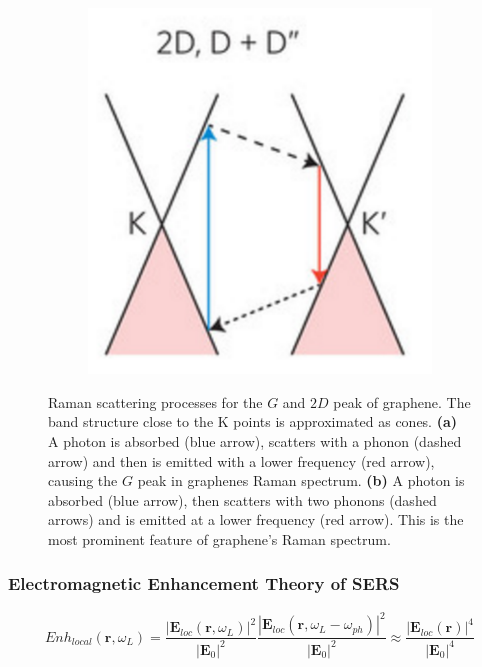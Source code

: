 \begin{figure}[!h]
\begin{subfigure}{0.2\textwidth}
  \end{subfigure}
  ~
  \begin{subfigure}{0.45\textwidth}
    \includegraphics[width=\textwidth]{./images/2d-mode.png}
  \end{subfigure}
  \caption{Raman scattering processes for the $G$ and $2D$ peak of graphene. The band structure close to the K points is approximated as cones. \textbf{(a)} A photon is absorbed (blue arrow), scatters with a phonon (dashed arrow) and then is emitted with a lower frequency (red arrow), causing the $G$ peak in graphenes Raman spectrum. \textbf{(b)} A photon is absorbed (blue arrow), then scatters with two phonons (dashed arrows) and is emitted at a lower frequency (red arrow). This is the most prominent feature of graphene's Raman spectrum. }
  \label{fig:raman-modes}
\end{figure}

\null\newpage
\null\newpage

\subsubsection{Electromagnetic Enhancement Theory of SERS}

\begin{equation}
  Enh_{local}(\mathbf{r},\omega_L)=\frac{\left|\mathbf{E}_{loc}(\mathbf{r}, \omega_L)\right|^2}{\left|\mathbf{E}_0\right|^2}\frac{\left|\mathbf{E}_{loc}(\mathbf{r}, \omega_L-\omega_{ph})\right|^2}{\left|\mathbf{E}_0\right|^2}\approx\frac{\left|\mathbf{E}_{loc}(\mathbf{r})\right|^4}{\left|\mathbf{E}_0\right|^4}
  \label{eq:enhancement}
\end{equation}

